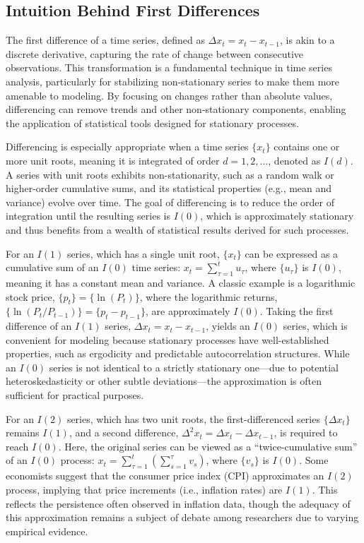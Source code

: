 	\subsection{Intuition Behind First Differences}
	
	The first difference of a time series, defined as \(\Delta x_t = x_t - x_{t-1}\), is akin to a discrete derivative, capturing the rate of change between consecutive observations. This transformation is a fundamental technique in time series analysis, particularly for stabilizing non-stationary series to make them more amenable to modeling. By focusing on changes rather than absolute values, differencing can remove trends and other non-stationary components, enabling the application of statistical tools designed for stationary processes.
	
	Differencing is especially appropriate when a time series \(\{x_t\}\) contains one or more unit roots, meaning it is integrated of order \(d = 1, 2, \ldots\), denoted as \(I(d)\). A series with unit roots exhibits non-stationarity, such as a random walk or higher-order cumulative sums, and its statistical properties (e.g., mean and variance) evolve over time. The goal of differencing is to reduce the order of integration until the resulting series is \(I(0)\), which is approximately stationary and thus benefits from a wealth of statistical results derived for such processes.
	
	For an \(I(1)\) series, which has a single unit root, \(\{x_t\}\) can be expressed as a cumulative sum of an \(I(0)\) time series: \(x_t = \sum_{\tau=1}^t u_\tau\), where \(\{u_\tau\}\) is \(I(0)\), meaning it has a constant mean and variance. A classic example is a logarithmic stock price, \(\{p_t\} = \{\ln(P_t)\}\), where the logarithmic returns, \(\{\ln(P_t / P_{t-1})\} = \{p_t - p_{t-1}\}\), are approximately \(I(0)\). Taking the first difference of an \(I(1)\) series, \(\Delta x_t = x_t - x_{t-1}\), yields an \(I(0)\) series, which is convenient for modeling because stationary processes have well-established properties, such as ergodicity and predictable autocorrelation structures. While an \(I(0)\) series is not identical to a strictly stationary one---due to potential heteroskedasticity or other subtle deviations---the approximation is often sufficient for practical purposes.
	
	For an \(I(2)\) series, which has two unit roots, the first-differenced series \(\{\Delta x_t\}\) remains \(I(1)\), and a second difference, \(\Delta^2 x_t = \Delta x_t - \Delta x_{t-1}\), is required to reach \(I(0)\). Here, the original series can be viewed as a ``twice-cumulative sum'' of an \(I(0)\) process: \(x_t = \sum_{\tau=1}^t \left( \sum_{s=1}^\tau v_s \right)\), where \(\{v_s\}\) is \(I(0)\). Some economists suggest that the consumer price index (CPI) approximates an \(I(2)\) process, implying that price increments (i.e., inflation rates) are \(I(1)\). This reflects the persistence often observed in inflation data, though the adequacy of this approximation remains a subject of debate among researchers due to varying empirical evidence.
	
